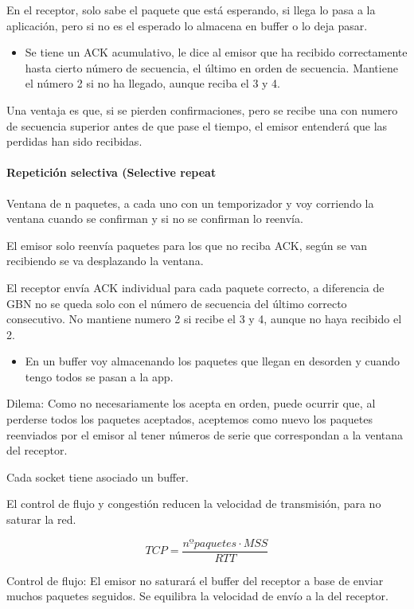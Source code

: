 \documentclass[12pt, twoside, openright]{report} %
\begin{document}
En el receptor, solo sabe el paquete que está esperando, si
llega lo pasa a la aplicación, pero si no es el esperado lo
almacena en buffer o lo deja pasar.

\begin{itemize}
	\item Se tiene un ACK acumulativo, le dice al emisor que ha recibido
	      correctamente hasta cierto número de secuencia, el último en
	      orden de secuencia. Mantiene el número 2 si no ha llegado,
	      aunque reciba el 3 y 4.
\end{itemize}

Una ventaja es que, si se pierden confirmaciones, pero se recibe
una con numero de secuencia superior antes de que pase el
tiempo, el emisor entenderá que las perdidas han sido recibidas.

\paragraph{Repetición selectiva (Selective repeat}

Ventana de n paquetes, a cada uno con un temporizador y voy
corriendo la ventana cuando se confirman y si no se confirman lo
reenvía.

El emisor solo reenvía paquetes para los que no reciba ACK,
según se van recibiendo se va desplazando la ventana.

El receptor envía ACK individual para cada paquete correcto, a
diferencia de GBN no se queda solo con el número de secuencia
del último correcto consecutivo. No mantiene numero 2 si recibe
el 3 y 4, aunque no haya recibido el 2.

\begin{itemize}
	\item En un buffer voy almacenando los paquetes que llegan en
	      desorden y cuando tengo todos se pasan a la app.
\end{itemize}

Dilema: Como no necesariamente los acepta en orden, puede
ocurrir que, al perderse todos los paquetes aceptados, aceptemos
como nuevo los paquetes reenviados por el emisor al tener
números de serie que correspondan a la ventana del receptor.


Cada socket tiene asociado un buffer.

El control de flujo y congestión reducen la velocidad de
transmisión, para no saturar la red.

$$TCP = \frac {nºpaquetes\cdot MSS}{RTT}$$

Control de flujo: El emisor no saturará el buffer del receptor a
base de enviar muchos paquetes seguidos. Se equilibra la velocidad
de envío a la del receptor.
\end{document}
